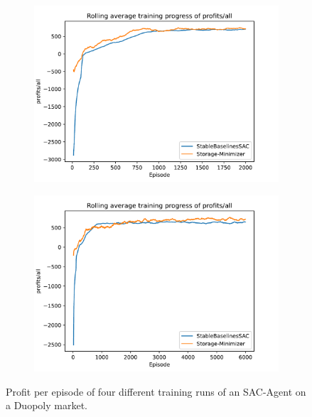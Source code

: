 \begin{figure}[!hbt]
	\begin{subfigure}{0.49\textwidth}
		\centering
		\includegraphics[width = \textwidth]{images/experiments/SACDuopoly/SACDuopolyProfitsMean3.pdf}\\
		\label{fig:SACDuopolyProfitsMean3}
	\end{subfigure}
	\begin{subfigure}{0.49\textwidth}
		\centering
		\includegraphics[width = \textwidth]{images/experiments/SACDuopoly/SACDuopolyProfitsMean4.pdf}\\
		\label{fig:SACDuopolyProfitsMean4}
	\end{subfigure}
	\caption{Profit per episode of four different training runs of an SAC-Agent on a Duopoly market.}\label{fig:SACDuopolyProfitsMean}
\end{figure}

